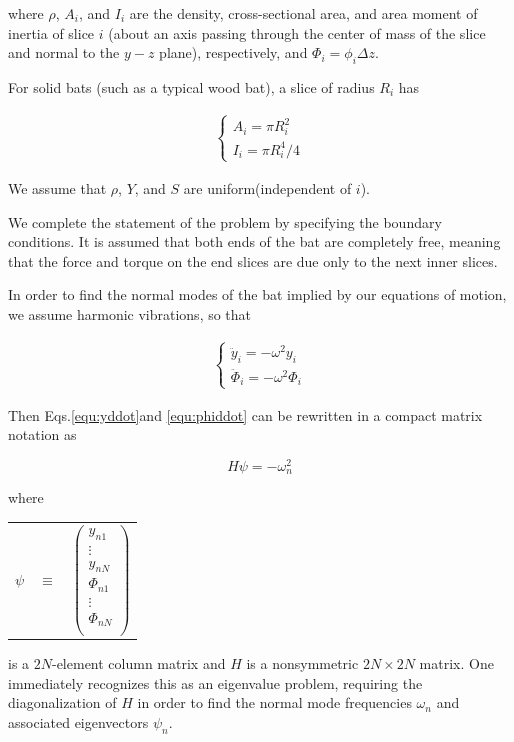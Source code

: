 \documentclass[12pt]{article}
\begin{document}
where $\rho$, $A_i$, and $I_i$ are the density, cross-sectional area, and area moment of inertia of slice $i$
(about an axis passing through the center of mass of the slice and normal to the $y-z$ plane),
respectively, and $\Phi_i=\phi_i\Delta z$.

For solid bats (such as a typical wood bat), a slice of radius $R_i$ has

\begin{eqnarray}
\left\{
\begin{array}{l}
A_i=\pi R_i^2\\
I_i=\pi{}R_i^4/4
\end{array}\right.
\end{eqnarray}

We assume that $\rho$, $Y$, and $S$ are uniform(independent of $i$).

We complete the statement of the problem by specifying the boundary conditions.
It is assumed that both ends of the bat are completely free\cite{H.Brody1990},
meaning that the force and torque on the end slices are due only to the next inner slices.

In order to find the normal modes of the bat implied by our equations of motion,
we assume harmonic vibrations, so that

\begin{eqnarray}
\left\{
\begin{array}{l}
\ddot{y}_i=-\omega^2 y_i\\
\ddot{\Phi}_i=-\omega^2\Phi_i
\end{array}\right.
\end{eqnarray}

Then Eqs.\ref{equ:yddot}and \ref{equ:phiddot} can
be rewritten in a compact matrix notation as

$$H\psi =-\omega_n^2$$

where
\begin{center}
\begin{tabular}{rcl}
$\psi$&$\equiv$&
$\left(
  \begin{array}{c}
    y_{n1} \\
    \vdots\\
    y_{nN} \\
    \Phi_{n1}\\
    \vdots\\
    \Phi_{nN}\\
  \end{array}
\right)$
\end{tabular}
\end{center}
is a $2N$-element column matrix and $H$ is a nonsymmetric $2N\times 2N$ matrix.
One immediately recognizes this as an eigenvalue problem,
requiring the diagonalization of $H$ in order to find the normal mode
frequencies $\omega_n$ and associated eigenvectors $\psi_n$.
\end{document}
